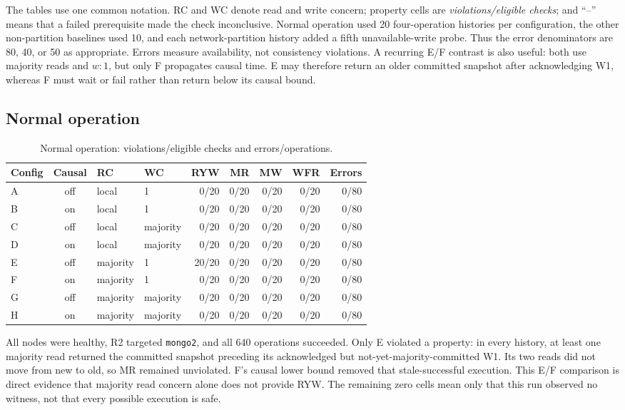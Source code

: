 \documentclass[11pt,a4paper]{article}
\begin{document}
The tables use one common notation. RC and WC denote read and write concern; property cells
are \emph{violations/eligible checks}; and ``--'' means that a failed prerequisite made the
check inconclusive. Normal operation used 20 four-operation histories per configuration, the
other non-partition baselines used 10, and each network-partition history added a fifth
unavailable-write probe. Thus the error denominators are 80, 40, or 50 as appropriate.
Errors measure availability, not consistency violations. A recurring E/F contrast is also
useful: both use majority reads and $w:1$, but only F propagates causal time. E may therefore
return an older committed snapshot after acknowledging W1, whereas F must wait or fail rather
than return below its causal bound.

\subsection{Normal operation}
\begin{table}[H]
\centering\scriptsize
\caption{Normal operation: violations/eligible checks and errors/operations.}
\begin{tabular}{@{}lcllrrrrr@{}}
\toprule Config & Causal & RC & WC & RYW & MR & MW & WFR & Errors\\ \midrule
A & off & local & 1 & 0/20 & 0/20 & 0/20 & 0/20 & 0/80\\
B & on  & local & 1 & 0/20 & 0/20 & 0/20 & 0/20 & 0/80\\
C & off & local & majority & 0/20 & 0/20 & 0/20 & 0/20 & 0/80\\
D & on  & local & majority & 0/20 & 0/20 & 0/20 & 0/20 & 0/80\\
E & off & majority & 1 & 20/20 & 0/20 & 0/20 & 0/20 & 0/80\\
F & on  & majority & 1 & 0/20 & 0/20 & 0/20 & 0/20 & 0/80\\
G & off & majority & majority & 0/20 & 0/20 & 0/20 & 0/20 & 0/80\\
H & on  & majority & majority & 0/20 & 0/20 & 0/20 & 0/20 & 0/80\\ \bottomrule
\end{tabular}
\end{table}

All nodes were healthy, R2 targeted \texttt{mongo2}, and all 640 operations succeeded.
Only E violated a property: in every history, at least one majority read returned the
committed snapshot preceding its acknowledged but not-yet-majority-committed W1. Its two
reads did not move from new to old, so MR remained unviolated. F's causal lower bound removed
that stale-successful execution. This E/F comparison is direct evidence that majority read
concern alone does not provide RYW. The remaining zero cells mean only that this run observed
no witness, not that every possible execution is safe.
\FloatBarrier
\end{document}
